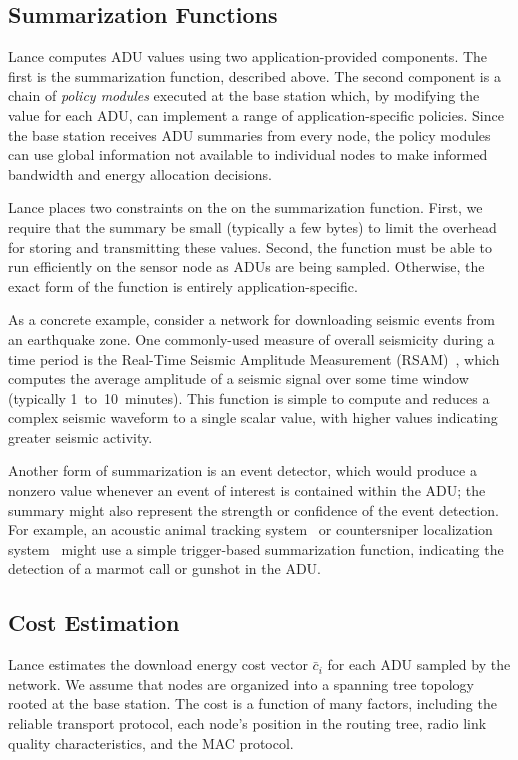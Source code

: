 \subsection{Summarization Functions}

Lance computes ADU values using two application-provided components. The
first is the summarization function, described above. The second component is
a chain of \textit{policy modules} executed at the base station which, by
modifying the value for each ADU, can implement a range of
application-specific policies. Since the base station receives ADU summaries
from every node, the policy modules can use global information not available
to individual nodes to make informed bandwidth and energy allocation
decisions.

Lance places two constraints on the on the summarization function. First, we
require that the summary be small (typically a few bytes) to limit the
overhead for storing and transmitting these values. Second, the function must
be able to run efficiently on the sensor node as ADUs are being sampled.
Otherwise, the exact form of the function is entirely application-specific.

As a concrete example, consider a network for downloading seismic events from
an earthquake zone. One commonly-used measure of overall seismicity during a
time period is the Real-Time Seismic Amplitude Measurement
(RSAM)~\cite{rsam}, which computes the average amplitude of a seismic signal
over some time window (typically 1~to~10~minutes). This function is simple
to compute and reduces a complex seismic waveform to a single scalar value,
with higher values indicating greater seismic activity.

Another form of summarization is an event detector, which would produce a
nonzero value whenever an event of interest is contained within the ADU; the
summary might also represent the strength or confidence of the event
detection. For example, an acoustic animal tracking
system~\cite{girod-ipsn07} or countersniper localization
system~\cite{shooter-localization} might use a simple trigger-based
summarization function, indicating the detection of a marmot call or gunshot
in the ADU.

\subsection{Cost Estimation}
\label{lance-subsec-costestimation}

Lance estimates the download energy cost vector $\bar{c}_i$ for each ADU
sampled by the network. We assume that nodes are organized into a spanning
tree topology rooted at the base station. The cost is a function of many
factors, including the reliable transport protocol, each node's position in
the routing tree, radio link quality characteristics, and the MAC protocol. 

